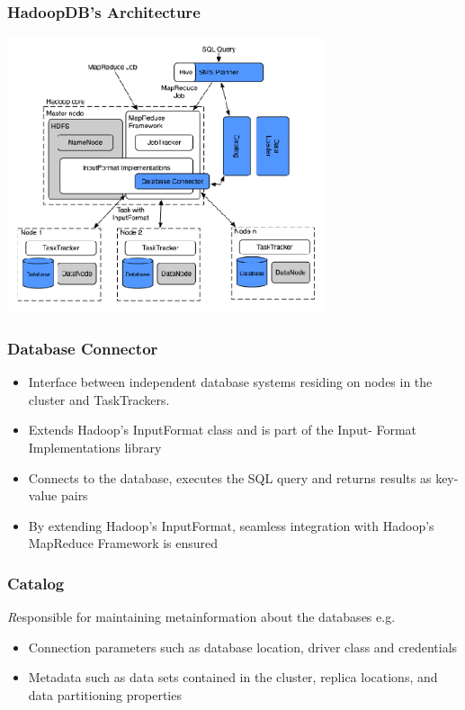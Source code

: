 \documentclass{beamer}
\begin{document}
\begin{frame}
  \frametitle{HadoopDB's  Architecture}
      \begin{center}
      \includegraphics[width=0.7\textwidth]{Architecture}
    \end{center}
\end{frame}

\begin{frame}
  \frametitle{Database Connector}
  \begin{itemize}
  \item Interface between independent database systems residing on nodes in the cluster and TaskTrackers.
  \item Extends Hadoop’s InputFormat class and is part of the Input- Format Implementations library
  \item Connects to the database, executes the SQL query and returns
    results as key-value pairs
    \item By extending Hadoop’s InputFormat, seamless integration with
      Hadoop’s MapReduce Framework is ensured
  \end{itemize}
\end{frame}


\begin{frame}
  \frametitle{Catalog}
  \emph Responsible for maintaining metainformation about
  the databases e.g.
  \begin{itemize}
  \item Connection parameters such as database location, driver class and credentials
  \item Metadata such as data sets contained in the cluster, replica locations, and data partitioning properties
  \end{itemize}
\end{frame}
\end{document}
